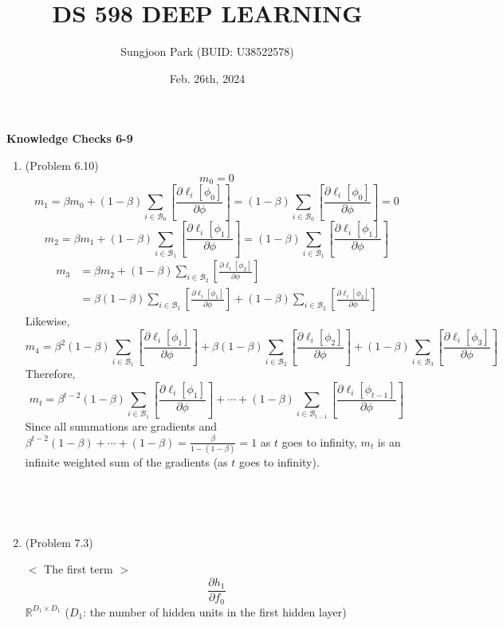 \documentclass[10pt]{article}
\title{DS 598 DEEP LEARNING}
\author{Sungjoon Park (BUID: U38522578)}
\date{Feb. 26th, 2024}
\begin{document}
\maketitle

\setlength{\parindent}{0cm}
\setlength{\parskip}{2mm}

\textbf{Knowledge Checks 6-9}

\begin{enumerate}

\item (Problem 6.10)
	$$m_0=0$$
	$$m_1=\beta m_0+(1-\beta)\sum_{i \in \mathcal{B}_0} [\frac{\partial \ell_i[\phi_0]}{\partial \phi}]=(1-\beta)\sum_{i \in \mathcal{B}_0} [\frac{\partial \ell_i[\phi_0]}{\partial \phi}]=0$$
	$$m_2=\beta m_1+(1-\beta)\sum_{i \in \mathcal{B}_1} [\frac{\partial \ell_i[\phi_1]}{\partial \phi}]=(1-\beta)\sum_{i \in \mathcal{B}_1} [\frac{\partial \ell_i[\phi_1]}{\partial \phi}]$$
	\begin{align*}
	m_3&=\beta m_2+(1-\beta)\sum_{i \in \mathcal{B}_2} [\frac{\partial \ell_i[\phi_2]}{\partial \phi}] \\
	&=\beta (1-\beta)\sum_{i \in \mathcal{B}_1} [\frac{\partial \ell_i[\phi_1]}{\partial \phi}]+(1-\beta)\sum_{i \in \mathcal{B}_2} [\frac{\partial \ell_i[\phi_2]}{\partial \phi}]
	\end{align*}
	Likewise,
	$$m_4=\beta^2 (1-\beta)\sum_{i \in \mathcal{B}_1} [\frac{\partial \ell_i[\phi_1]}{\partial \phi}]+\beta(1-\beta)\sum_{i \in \mathcal{B}_2} [\frac{\partial \ell_i[\phi_2]}{\partial \phi}]+(1-\beta)\sum_{i \in \mathcal{B}_3} [\frac{\partial \ell_i[\phi_3]}{\partial \phi}]$$
	Therefore,
	$$m_t=\beta^{t-2}(1-\beta)\sum_{i \in \mathcal{B}_1} [\frac{\partial \ell_i[\phi_1]}{\partial \phi}]+\cdots+(1-\beta)\sum_{i \in \mathcal{B}_{t-1}} [\frac{\partial \ell_i[\phi_{t-1}]}{\partial \phi}]$$
	Since all summations are gradients and $\beta^{t-2}(1-\beta)+\cdots+(1-\beta)=\frac{\beta}{1-(1-\beta)}=1$ as $t$ goes to infinity, $m_t$ is an infinite weighted sum of the gradients (as $t$ goes to infinity).

\

\

\item (Problem 7.3)
	
	$<$ The first term $>$
	$$\frac{\partial h_1}{\partial f_0}$$
	$\mathbb{R}^{D_1 \times D_1}$ ($D_1$: the number of hidden units in the first hidden layer)
	

\end{enumerate}
\end{document}
